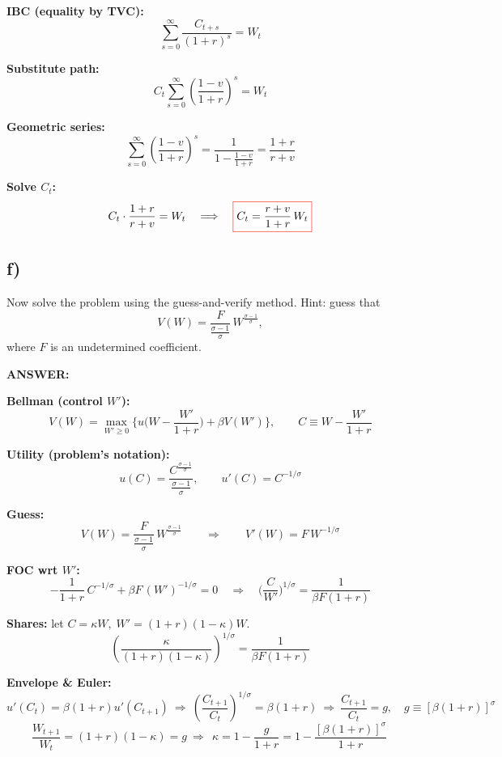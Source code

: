 \documentclass[12pt]{article}
\begin{document}
\textbf{IBC (equality by TVC):}
\[
\sum_{s=0}^{\infty}\frac{C_{t+s}}{(1+r)^s}=W_t
\]

\textbf{Substitute path:}
\[
C_t\sum_{s=0}^{\infty}\left(\frac{1-v}{1+r}\right)^s=W_t
\]

\textbf{Geometric series:}
\[
\sum_{s=0}^{\infty}\left(\frac{1-v}{1+r}\right)^s
=\frac{1}{1-\frac{1-v}{1+r}}
=\frac{1+r}{r+v}
\]

\textbf{Solve $C_t$:}
\[
C_t\cdot\frac{1+r}{r+v}=W_t
\quad\Longrightarrow\quad
\fcolorbox{red}{white}{$\displaystyle C_t=\frac{r+v}{1+r}\,W_t$}
\]


\subsection*{\noindent\textbf{f)}}

Now solve the problem using the guess-and-verify method. Hint: guess that
\[
V(W)=\frac{F}{\tfrac{\sigma-1}{\sigma}}\,W^{\tfrac{\sigma-1}{\sigma}},
\]
where \(F\) is an undetermined coefficient.



\vspace{0.5em}
\noindent\textcolor{formalred}{\textbf{ANSWER:}}


\textbf{Bellman (control $W'$):}
\[
V(W)=\max_{W'\ge0}\Big\{u\!\Big(W-\frac{W'}{1+r}\Big)+\beta V(W')\Big\},
\qquad C\equiv W-\frac{W'}{1+r}
\]

\textbf{Utility (problem’s notation):}
\[
u(C)=\frac{C^{\tfrac{\sigma-1}{\sigma}}}{\tfrac{\sigma-1}{\sigma}},
\qquad
u'(C)=C^{-1/\sigma}
\]

\textbf{Guess:}
\[
V(W)=\frac{F}{\tfrac{\sigma-1}{\sigma}}\,W^{\tfrac{\sigma-1}{\sigma}}
\qquad\Rightarrow\qquad
V'(W)=F\,W^{-1/\sigma}
\]

\textbf{FOC wrt $W'$:}
\[
-\frac{1}{1+r}\,C^{-1/\sigma}+\beta F\,(W')^{-1/\sigma}=0
\quad\Rightarrow\quad
\Big(\frac{C}{W'}\Big)^{\!1/\sigma}=\frac{1}{\beta F(1+r)}
\tag{A}
\]

\textbf{Shares:} let \(C=\kappa W,\; W'=(1+r)(1-\kappa)W\).
\[
\left(\frac{\kappa}{(1+r)(1-\kappa)}\right)^{\!1/\sigma}=\frac{1}{\beta F(1+r)}
\tag{B}
\]

\textbf{Envelope \& Euler:}
\[
u'(C_t)=\beta(1+r)u'(C_{t+1})
\ \Rightarrow\
\left(\frac{C_{t+1}}{C_t}\right)^{1/\sigma}=\beta(1+r)
\ \Rightarrow\
\frac{C_{t+1}}{C_t}=g,\quad g\equiv[\beta(1+r)]^{\sigma}
\]
\[
\frac{W_{t+1}}{W_t}=(1+r)(1-\kappa)=g
\ \Rightarrow\
\boxed{\ \kappa=1-\frac{g}{1+r}=1-\frac{[\beta(1+r)]^{\sigma}}{1+r}\ }
\tag{C}
\]
\end{document}
